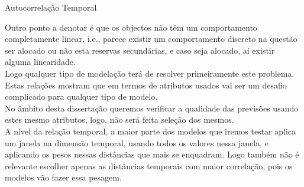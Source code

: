 \begin{table}[H]
  \caption{Autocorrelação Temporal}    
  \resizebox{\linewidth}{!}{}
  \label{tab:tempcorr}
  \end{table}

Outro ponto a denotar é que os objectos não têm um comportamento completamente linear, i.e., parece existir um comportamento discreto na questão ser alocado ou não esta reservas secundárias, e caso seja alocado, aí existir alguma linearidade. \\
Logo qualquer tipo de modelação terá de resolver primeiramente este problema. \\
Estas relações mostram que em termos de atributos usados vai ser um desafio complicado para qualquer tipo de modelo. \\
No âmbito desta dissertação queremos verificar a qualidade das previsões usando estes mesmo atributos, logo, não será feita seleção dos mesmos. \\
A nível da relação temporal, a maior parte dos modelos que iremos testar aplica um janela na dimensão temporal, usando todos os valores nessa janela, e aplicando os pesos nessas distâncias que mais se enquadram. Logo também não é relevante escolher apenas as distâncias temporais com maior correlação, pois os modelos vão fazer essa pesagem. \\


